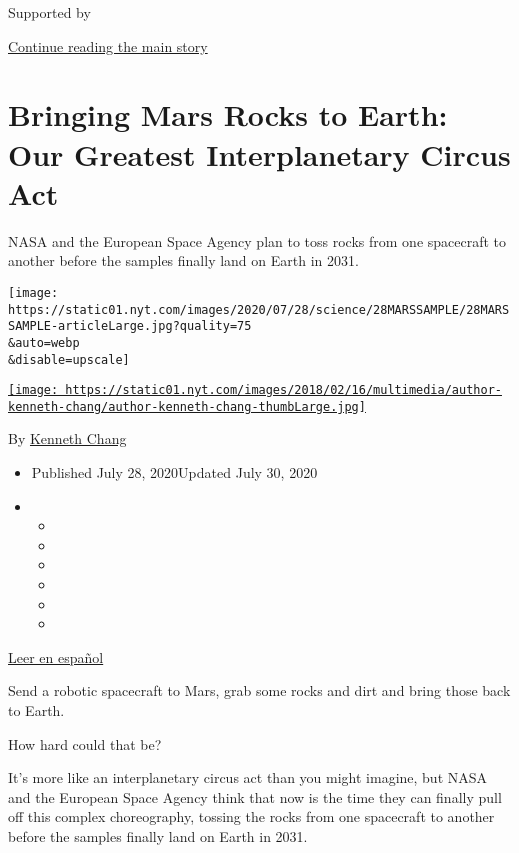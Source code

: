 Supported by

\protect\hyperlink{after-sponsor}{Continue reading the main story}

\hypertarget{bringing-mars-rocks-to-earth-our-greatest-interplanetary-circus-act}{%
\section{Bringing Mars Rocks to Earth: Our Greatest Interplanetary
Circus
Act}\label{bringing-mars-rocks-to-earth-our-greatest-interplanetary-circus-act}}

NASA and the European Space Agency plan to toss rocks from one
spacecraft to another before the samples finally land on Earth in 2031.

\texttt{[image: https://static01.nyt.com/images/2020/07/28/science/28MARSSAMPLE/28MARSSAMPLE-articleLarge.jpg?quality=75\\\&auto=webp\\\&disable=upscale]}

\href{https://www.nytimes.com/by/kenneth-chang}{\texttt{[image: https://static01.nyt.com/images/2018/02/16/multimedia/author-kenneth-chang/author-kenneth-chang-thumbLarge.jpg]}}

By \href{https://www.nytimes.com/by/kenneth-chang}{Kenneth Chang}

\begin{itemize}
\item
  Published July 28, 2020Updated July 30, 2020
\item
  \begin{itemize}
  \item
  \item
  \item
  \item
  \item
  \item
  \end{itemize}
\end{itemize}

\href{https://www.nytimes.com/es/2020/07/29/espanol/ciencia-y-tecnologia/mision-marte-nasa.html}{Leer
en español}

Send a robotic spacecraft to Mars, grab some rocks and dirt and bring
those back to Earth.

How hard could that be?

It's more like an interplanetary circus act than you might imagine, but
NASA and the European Space Agency think that now is the time they can
finally pull off this complex choreography, tossing the rocks from one
spacecraft to another before the samples finally land on Earth in 2031.

